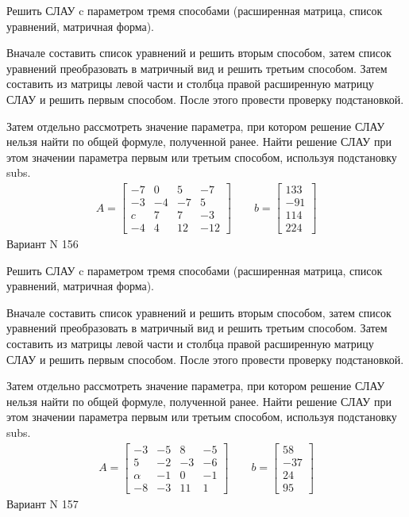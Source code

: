 \documentclass[11pt]{report}
\begin{document}
Решить СЛАУ c параметром тремя способами (расширенная матрица, список уравнений, матричная форма).

Вначале составить список уравнений и решить вторым способом,
затем список уравнений преобразовать в матричный вид и решить третьим способом.
Затем составить из матрицы левой части и столбца правой расширенную матрицу СЛАУ и решить первым способом.
После этого провести проверку подстановкой.

Затем отдельно рассмотреть значение параметра, при котором решение СЛАУ нельзя найти по общей формуле,
полученной ранее.
Найти решение СЛАУ при этом значении параметра первым или третьим способом, используя подстановку subs.
\begin{align*}
    A = \left[\begin{matrix}-7 & 0 & 5 & -7\\-3 & -4 & -7 & 5\\c & 7 & 7 & -3\\-4 & 4 & 12 & -12\end{matrix}\right]
\qquad b = \left[\begin{matrix}133\\-91\\114\\224\end{matrix}\right]
\end{align*}
\newpage
Вариант N 156


Решить СЛАУ c параметром тремя способами (расширенная матрица, список уравнений, матричная форма).

Вначале составить список уравнений и решить вторым способом,
затем список уравнений преобразовать в матричный вид и решить третьим способом.
Затем составить из матрицы левой части и столбца правой расширенную матрицу СЛАУ и решить первым способом.
После этого провести проверку подстановкой.

Затем отдельно рассмотреть значение параметра, при котором решение СЛАУ нельзя найти по общей формуле,
полученной ранее.
Найти решение СЛАУ при этом значении параметра первым или третьим способом, используя подстановку subs.
\begin{align*}
    A = \left[\begin{matrix}-3 & -5 & 8 & -5\\5 & -2 & -3 & -6\\\alpha & -1 & 0 & -1\\-8 & -3 & 11 & 1\end{matrix}\right]
\qquad b = \left[\begin{matrix}58\\-37\\24\\95\end{matrix}\right]
\end{align*}
\newpage
Вариант N 157
\end{document}
